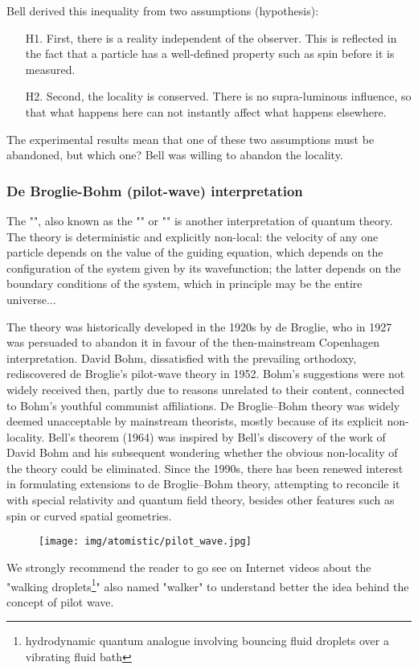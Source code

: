 	Bell derived this inequality from two assumptions (hypothesis):
	\begin{enumerate}
		\item[H1.] First, there is a reality independent of the observer. This is reflected in the fact that a particle has a well-defined property such as spin before it is measured. 

		\item[H2.] Second, the locality is conserved. There is no supra-luminous influence, so that what happens here can not instantly affect what happens elsewhere. 
	\end{enumerate}
	The experimental results mean that one of these two assumptions must be abandoned, but which one? Bell was willing to abandon the locality.
	
	\subsubsection{De Broglie-Bohm (pilot-wave) interpretation}
	The "", also known as the "" or "" is another interpretation of quantum theory. The theory is deterministic and explicitly non-local: the velocity of any one particle depends on the value of the guiding equation, which depends on the configuration of the system given by its wavefunction; the latter depends on the boundary conditions of the system, which in principle may be the entire universe...

	The theory was historically developed in the 1920s by de Broglie, who in 1927 was persuaded to abandon it in favour of the then-mainstream Copenhagen interpretation. David Bohm, dissatisfied with the prevailing orthodoxy, rediscovered de Broglie's pilot-wave theory in 1952. Bohm's suggestions were not widely received then, partly due to reasons unrelated to their content, connected to Bohm's youthful communist affiliations. De Broglie–Bohm theory was widely deemed unacceptable by mainstream theorists, mostly because of its explicit non-locality. Bell's theorem (1964) was inspired by Bell's discovery of the work of David Bohm and his subsequent wondering whether the obvious non-locality of the theory could be eliminated. Since the 1990s, there has been renewed interest in formulating extensions to de Broglie–Bohm theory, attempting to reconcile it with special relativity and quantum field theory, besides other features such as spin or curved spatial geometries.
	\begin{figure}[H]
		\centering
		\texttt{[image: img/atomistic/pilot\_wave.jpg]}
	\end{figure}
	We strongly recommend the reader to go see on Internet videos about the "walking droplets\footnote{hydrodynamic quantum analogue involving bouncing fluid droplets over a vibrating fluid bath}" also named "walker" to understand better the idea behind the concept of pilot wave. 
	
